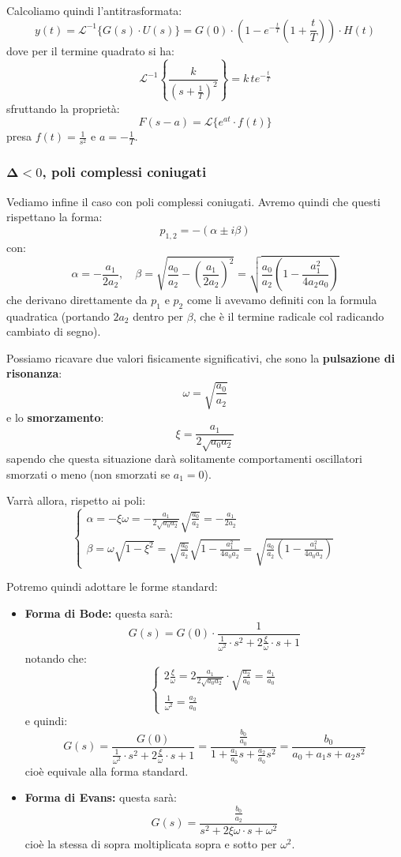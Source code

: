 \documentclass[a4paper,11pt]{article}
\begin{document}
Calcoliamo quindi l'antitrasformata:
$$
y(t) = \mathcal{L}^{-1} \{G(s) \cdot U(s)\} = G(0) \cdot \left( 1 - e^{-\frac{t}{T}} \left( 1 + \frac{t}{T} \right) \right) \cdot H(t)
$$
dove per il termine quadrato si ha:
$$
\mathcal{L}^{-1} \left\{ \frac{ k }{ \left( s + \frac{1}{T} \right)^2 } \right\} = k \, t e^{-\frac{t}{T}}
$$
sfruttando la proprietà:
$$
F(s - a) = \mathcal{L} \{ e^{at} \cdot f(t) \}
$$
presa $f(t) = \frac{1}{s^2}$ e $a = -\frac{1}{T}$.

\subsubsection{$\mathbf \Delta < 0$, poli complessi coniugati}
Vediamo infine il caso con poli complessi coniugati.
Avremo quindi che questi rispettano la forma:
$$
p_{1,2} =  - \left( \alpha \pm i \beta \right)
$$
con:
$$
\alpha = -\frac{a_1}{2a_2}, \quad \beta = \sqrt{ \frac{a_0}{a_2} - \left( \frac{a_1}{2 a_2} \right)^2 } = \sqrt{ \frac{a_0}{a_2} \left( 1 - \frac{a_1^2}{4 a_2 a_0} \right) }
$$
che derivano direttamente da $p_1$ e $p_2$ come li avevamo definiti con la formula quadratica (portando $2 a_2$ dentro per $\beta$, che è il termine radicale col radicando cambiato di segno).

Possiamo ricavare due valori fisicamente significativi, che sono la \textbf{pulsazione di risonanza}:
$$
\omega = \sqrt{\frac{a_0}{a_2}}
$$
e lo \textbf{smorzamento}:
$$
\xi = \frac{a_1}{2 \sqrt{a_0 a_2}}
$$
sapendo che questa situazione darà solitamente comportamenti oscillatori smorzati o meno (non smorzati se $a_1 = 0$).

Varrà allora, rispetto ai poli:
\[
	\begin{cases}
		\alpha = -\xi \omega = - \frac{a_1}{2 \sqrt{a_0 a_2}} \sqrt{ \frac{a_0}{a_2} } = -\frac{a_1}{2 a_2} \\
		\beta = \omega \sqrt{1 - \xi^2} = \sqrt{ \frac{a_0}{a_2} } \sqrt{ 1 - \frac{a_1^2}{4 a_0 a_2} } = \sqrt{ \frac{a_0}{a_2} \left( 1 - \frac{a_1^2}{4 a_0 a_2} \right) }
	\end{cases}
\]

Potremo quindi adottare le forme standard:
\begin{itemize}
	\item \textbf{Forma di Bode:} questa sarà:
$$
G(s) = G(0) \cdot \frac{ 1 }{ \frac{1}{\omega^2} \cdot s^2 + 2 \frac{\xi}{\omega} \cdot s + 1 }
$$
notando che:
\[
	\begin{cases}
		2 \frac{\xi}{\omega} = 2 \frac{a_1}{2 \sqrt{a_0 a_2}} \cdot \sqrt{\frac{a_2}{a_0}} = \frac{a_1}{a_0} \\
		\frac{1}{\omega^2} = \frac{a_2}{a_0}
	\end{cases}
\]
e quindi:
$$
G(s) = \frac{ G(0) }{ \frac{1}{\omega^2} \cdot s^2 + 2 \frac{\xi}{\omega} \cdot s + 1 } = \frac{ \frac{b_0}{a_0} }{ 1 + \frac{a_1}{a_0} s + \frac{a_2}{a_0} s^2} = \frac{b_0}{a_0 + a_1 s + a_2 s^2}
$$
cioè equivale alla forma standard.
	\item \textbf{Forma di Evans:} questa sarà:
$$
G(s) = \frac{ \frac{b_0}{a_2} }{ s^2 + 2 \xi \omega \cdot s + \omega^2 }
$$
cioè la stessa di sopra moltiplicata sopra e sotto per $\omega^2$.
\end{itemize}
\end{document}
